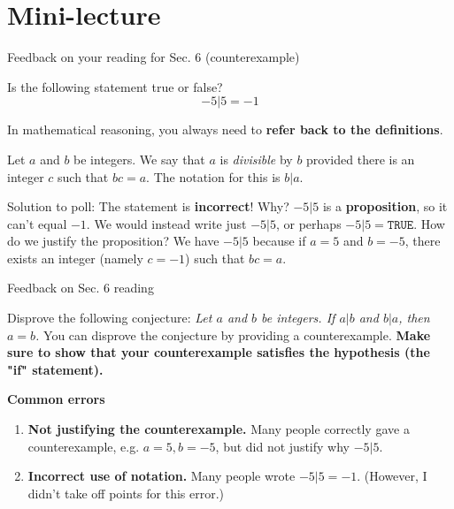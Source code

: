 \documentclass[10pt]{beamer}
\begin{document}
\section{Mini-lecture}



\begin{frame}{Feedback on your reading for Sec. 6 (counterexample)}

\begin{myyellowbox}[title=Poll]
Is the following statement true or false? 
\[ -5|5 = -1 \] 
\end{myyellowbox}

\pause 

\begin{myredbox}[title=Alert!]
In mathematical reasoning, you always need to \textbf{refer back to the definitions}.    
\end{myredbox}

\pause 
	\begin{mydef}[title=Reminder of Definition 3.2 (\textbf{Divisible})]
	Let $a$ and $b$ be integers.  We say that $a$ is \textit{divisible} by $b$ provided there is an integer $c$ such that $bc=a$. The notation for this is $b|a$. 
	\end{mydef}
\pause 
\footnotesize 
Solution to poll: The statement is \textbf{incorrect}! Why? \pause $-5|5$ is a \textbf{proposition}, so it can't equal $-1$. We would instead write just $-5|5$, or perhaps $-5|5 = \texttt{TRUE}$. How do we justify the proposition? \pause We have $-5|5$ because if $a=5$ and $b=-5$, there exists an integer (namely $c=-1$) such that $bc=a$.
\end{frame}

\begin{frame}{Feedback on Sec. 6 reading}

 \begin{mygreenbox}[title=Reading Quiz (Sec. 6 - Counterexamples)]
Disprove the following conjecture:  
\textit{Let $a$ and $b$ be integers.  If $a|b$ and $b|a$, then $a=b$.}   You can disprove the conjecture by providing a counterexample.  \textbf{Make sure to show that your counterexample satisfies the hypothesis (the "if" statement).} 
\vfill 
\end{mygreenbox}

\textbf{Common errors}
\begin{enumerate}
\item \textbf{Not justifying the counterexample.} Many people correctly gave a counterexample, e.g. $a=5, b=-5$, but did not justify why $-5|5$. 
\item \textbf{Incorrect use of notation.} Many people wrote $-5|5=-1$.  (However, I didn't take off points for this error.) 
\end{enumerate}
\end{frame}
\end{document}

